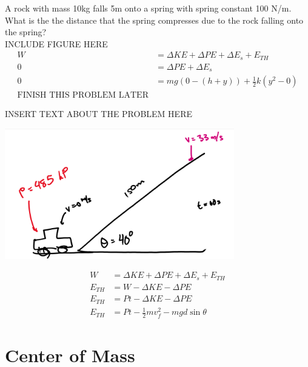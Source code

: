 \begin{problem}
    A rock with mass 10kg falls 5m onto a spring with spring constant 100 N/m. What is the the distance that the spring compresses due to the rock falling onto the spring?\\
    
    INCLUDE FIGURE HERE\\

    $$
    \begin{aligned}
        W &= \Delta KE + \Delta PE + \Delta E_s + E_{TH}\\
        0 &= \Delta PE + \Delta E_s\\
        0 &= mg(0-(h+y))+\frac{1}{2}k(y^2-0)\\
        \text{FINISH THIS PROBLEM LATER}
    \end{aligned}
    $$
\end{problem}


\begin{problem}
    INSERT TEXT ABOUT THE PROBLEM HERE

    \begin{center}
        \includegraphics[width=0.75\textwidth]{chapters/ch4/images/fig4_13.PNG}
    \end{center}

    $$
    \begin{aligned}
        W &= \Delta KE + \Delta PE +\Delta E_s + E_{TH}\\
        E_{TH} &= W - \Delta KE - \Delta PE\\
        E_{TH} &= Pt - \Delta KE - \Delta PE\\
        E_{TH} &= Pt - \frac{1}{2}mv_f^2 - mgd\sin\theta
    \end{aligned}
    $$
\end{problem}



\section{Center of Mass}


